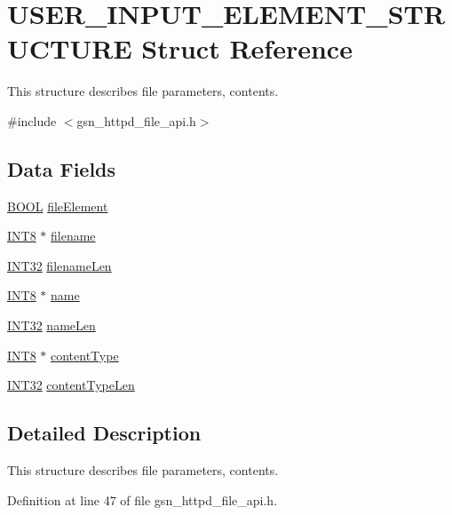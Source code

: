 \hypertarget{a00463}{
\section{USER\_\-INPUT\_\-ELEMENT\_\-STRUCTURE Struct Reference}
\label{a00463}
}


This structure describes file parameters, contents.  




{\ttfamily \#include $<$gsn\_\-httpd\_\-file\_\-api.h$>$}

\subsection*{Data Fields}
\begin{DoxyCompactItemize}
\item 
\hyperlink{a00660_ga1f04022c0a182c51c059438790ea138c}{BOOL} \hyperlink{a00463_af6f47e6b744c37f81f53db4217bbfaa6}{fileElement}
\item 
\hyperlink{a00660_ga307b8734c020247f6bac4fcde0dcfbb9}{INT8} $\ast$ \hyperlink{a00463_af11b17d23d1a9ceb18cae1b4597735a6}{filename}
\item 
\hyperlink{a00660_ga63021d67d54286c2163bcdb43a6f2569}{INT32} \hyperlink{a00463_a461cd3bb3ee35a9c12aaf4b124183712}{filenameLen}
\item 
\hyperlink{a00660_ga307b8734c020247f6bac4fcde0dcfbb9}{INT8} $\ast$ \hyperlink{a00463_a0223d2eb5edfad56f8aecd69a1e63b4b}{name}
\item 
\hyperlink{a00660_ga63021d67d54286c2163bcdb43a6f2569}{INT32} \hyperlink{a00463_a9dddb53eeb9ed9a2cc273d535b0faaa8}{nameLen}
\item 
\hyperlink{a00660_ga307b8734c020247f6bac4fcde0dcfbb9}{INT8} $\ast$ \hyperlink{a00463_a941825af896d421aeb2614cbc8156c0a}{contentType}
\item 
\hyperlink{a00660_ga63021d67d54286c2163bcdb43a6f2569}{INT32} \hyperlink{a00463_acee70ab09e9270e13fb12d74a1d0e2cf}{contentTypeLen}
\end{DoxyCompactItemize}


\subsection{Detailed Description}
This structure describes file parameters, contents. 

Definition at line 47 of file gsn\_\-httpd\_\-file\_\-api.h.



